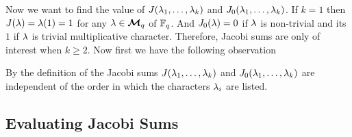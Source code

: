 Now we want to find the value of $J(\lambda_1,\dots, \lambda_k)$ and $J_0(\lambda_1,\dots, \lambda_k)$. If $k=1$ then $J(\lambda)=\lambda(1)=1$ for any $\lambda\in\boldsymbol{\mathcal{M}}_q$ of $\mathbb{F}_q$. And $J_0(\lambda)=0$ if $\lambda$ is non-trivial and its $1$ if $\lambda$ is trivial multiplicative character. Therefore, Jacobi sums are only of interest when $k\geq 2$. Now first we have the following observation
\begin{observation}\label{obs:jacobi-sum-symmetric}
  By the definition of the Jacobi sums $J(\lambda_1,\dots, \lambda_k)$ and $J_0(\lambda_1,\dots, \lambda_k)$ are independent of the order in which the characters $\lambda_i$ are listed.
\end{observation} 

\subsection{Evaluating Jacobi Sums}


